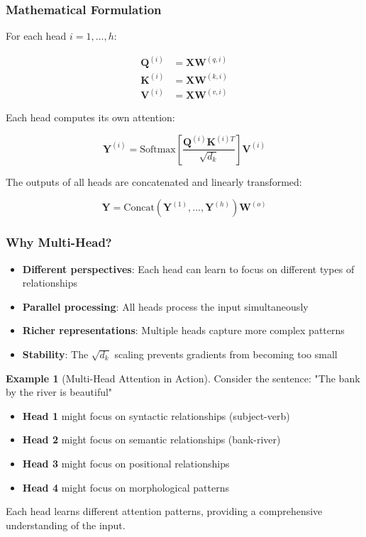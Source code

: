 \documentclass[11pt,a4paper]{article}
\theoremstyle{definition}
\newtheorem{example}{Example}[section]
\theoremstyle{plain}
\theoremstyle{remark}
\begin{document}
\subsubsection{Mathematical Formulation}

For each head $i = 1, \ldots, h$:

\begin{align*}
\mathbf{Q}^{(i)} &= \mathbf{X}\mathbf{W}^{(q,i)} \\
\mathbf{K}^{(i)} &= \mathbf{X}\mathbf{W}^{(k,i)} \\
\mathbf{V}^{(i)} &= \mathbf{X}\mathbf{W}^{(v,i)}
\end{align*}

Each head computes its own attention:

\[
\mathbf{Y}^{(i)} = \text{Softmax}\left[\frac{\mathbf{Q}^{(i)}\mathbf{K}^{(i)T}}{\sqrt{d_k}}\right]\mathbf{V}^{(i)}
\]

The outputs of all heads are concatenated and linearly transformed:

\[
\mathbf{Y} = \text{Concat}(\mathbf{Y}^{(1)}, \ldots, \mathbf{Y}^{(h)})\mathbf{W}^{(o)}
\]

\subsubsection{Why Multi-Head?}

\begin{itemize}
    \item \textbf{Different perspectives}: Each head can learn to focus on different types of relationships
    \item \textbf{Parallel processing}: All heads process the input simultaneously
    \item \textbf{Richer representations}: Multiple heads capture more complex patterns
    \item \textbf{Stability}: The $\sqrt{d_k}$ scaling prevents gradients from becoming too small
\end{itemize}

\begin{example}[Multi-Head Attention in Action]
Consider the sentence: "The bank by the river is beautiful"

\begin{itemize}
    \item \textbf{Head 1} might focus on syntactic relationships (subject-verb)
    \item \textbf{Head 2} might focus on semantic relationships (bank-river)
    \item \textbf{Head 3} might focus on positional relationships
    \item \textbf{Head 4} might focus on morphological patterns
\end{itemize}

Each head learns different attention patterns, providing a comprehensive understanding of the input.
\end{example}
\end{document}
